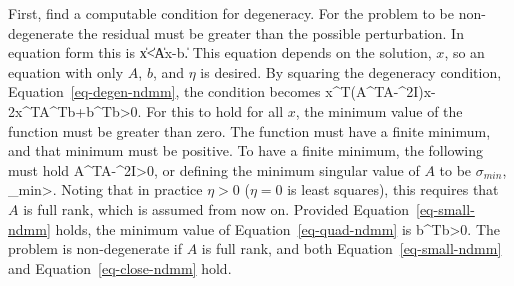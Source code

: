 First, find a computable condition for degeneracy.  For the problem to be
non-degenerate the residual must be greater than the possible
perturbation.  In equation form this is
\beq
\eta\|x\|<\|Ax-b\|. \label{eq-degen-ndmm}
\eeq
This equation depends on the solution, $x$, so an equation with only
$A$, $b$, and $\eta$ is desired.  By squaring the degeneracy
condition, Equation~\ref{eq-degen-ndmm}, the condition becomes
\beq
x^{T}(A^{T}A-\eta^{2}I)x-2x^{T}A^{T}b+b^{T}b>0. \label{eq-quad-ndmm}
\eeq
For this to hold for all $x$, the minimum value of the function must
be greater than zero.  The function must have a finite minimum, and
that minimum must be positive.  To have a finite minimum, the
following must hold
\beqn
A^{T}A-\eta^{2}I>0,
\eeqn
or defining the minimum singular value of $A$ to be $\sigma_{min}$,
\beq
\sigma_{min}>\eta. \label{eq-small-ndmm}
\eeq
Noting that in practice $\eta>0$ ($\eta=0$ is least squares), this requires
that $A$ is full rank, which is assumed from now on.  Provided
Equation~\ref{eq-small-ndmm} holds, the minimum value of
Equation~\ref{eq-quad-ndmm} is
\beq
b^{T}b>0. \label{eq-close-ndmm}
\eeq
The problem is non-degenerate if $A$ is full rank, and both
Equation~\ref{eq-small-ndmm} and Equation~\ref{eq-close-ndmm} hold.

